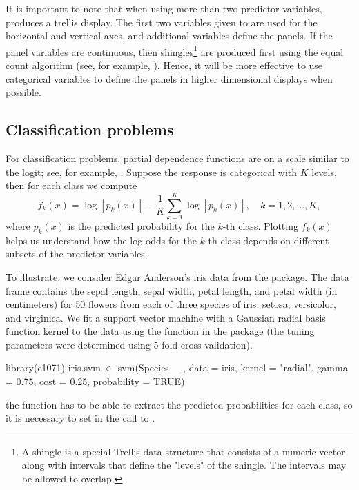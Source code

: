 It is important to note that when using more than two predictor variables,  produces a trellis display. The first two variables given to  are used for the horizontal and vertical axes, and additional variables define the panels. If the panel variables are continuous, then shingles\footnote{A shingle is a special Trellis data structure that consists of a numeric vector along with intervals that define the "levels" of the shingle. The intervals may be allowed to overlap.} are produced first using the equal count algorithm (see, for example, ). Hence, it will be more effective to use categorical variables to define the panels in higher dimensional displays when possible.


\subsection{Classification problems}
\label{sec:class}

For classification problems, partial dependence functions are on a scale similar to the logit; see, for example, \citet[pp. 369---370]{hastie-elements-2009}. Suppose the response is categorical with $K$ levels, then for each class we compute
\begin{equation}
\label{eqn:avg-logit}
f_k(x) = \log\left[p_k(x)\right] - \frac{1}{K}\sum_{k = 1}^K\log\left[p_k(x)\right], \quad k = 1, 2, \dots, K,
\end{equation}
where $p_k(x)$ is the predicted probability for the $k$-th class. Plotting $f_k(x)$ helps us understand how the log-odds for the $k$-th class depends on different subsets of the predictor variables.

To illustrate, we consider Edgar Anderson's iris data from the  package. The  data frame contains the sepal length, sepal width, petal length, and petal width (in centimeters) for 50 flowers from each of three species of iris:  setosa, versicolor, and virginica. We fit a support vector machine with a Gaussian radial basis function kernel to the data using the  function in the  package (the tuning parameters were determined using 5-fold cross-validation).
\begin{example}
library(e1071)
iris.svm <- svm(Species ~ ., data = iris, kernel = "radial", gamma = 0.75,
                cost = 0.25, probability = TRUE)
\end{example}
 the  function has to be able to extract the predicted probabilities for each class, so it is necessary to set  in the call to .

